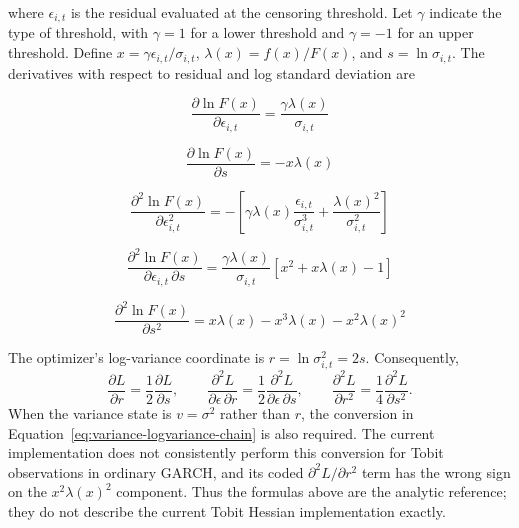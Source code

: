 \documentclass[12pt]{article}
\begin{document}
where $\epsilon_{i,t}$ is the residual evaluated at the censoring threshold. Let
$\gamma$ indicate the type of threshold, with $\gamma = 1$ for a
lower threshold and $\gamma = -1$ for an upper threshold. Define $x=\gamma\epsilon_{i,t}/\sigma_{i,t}$, $\lambda(x)=f(x)/F(x)$, and $s=\ln\sigma_{i,t}$. The derivatives with respect to residual and log standard deviation are

\begin{equation}
\frac{\partial\ln F(x)}{\partial\epsilon_{i,t}} = \frac{\gamma\lambda(x)}{\sigma_{i,t}}
\label{eq:tobit_deriv1}
\end{equation}

\begin{equation}
\frac{\partial\ln F(x)}{\partial s}=-x\lambda(x)
\label{eq:tobit_deriv2}
\end{equation}

\begin{equation}
\frac{\partial^{2}\ln F(x)}{\partial\epsilon_{i,t}^{2}}=-\left[\gamma\lambda(x)\frac{\epsilon_{i,t}}{\sigma_{i,t}^{3}}+\frac{\lambda(x)^{2}}{\sigma_{i,t}^{2}}\right]
\label{eq:tobit_deriv3}
\end{equation}

\begin{equation}
\frac{\partial^{2}\ln F(x)}{\partial\epsilon_{i,t}\,\partial s}
=\frac{\gamma\lambda(x)}{\sigma_{i,t}}\left[x^{2}+x\lambda(x)-1\right]
\label{eq:tobit_deriv4}
\end{equation}

\begin{equation}
\frac{\partial^{2}\ln F(x)}{\partial s^{2}}
=x\lambda(x)-x^{3}\lambda(x)-x^{2}\lambda(x)^{2}
\label{eq:tobit_deriv5}
\end{equation}

The optimizer's log-variance coordinate is $r=\ln\sigma_{i,t}^{2}=2s$. Consequently,
\begin{equation}
\frac{\partial L}{\partial r}=\frac{1}{2}\frac{\partial L}{\partial s},\qquad
\frac{\partial^{2}L}{\partial\epsilon\,\partial r}=\frac{1}{2}\frac{\partial^{2}L}{\partial\epsilon\,\partial s},\qquad
\frac{\partial^{2}L}{\partial r^{2}}=\frac{1}{4}\frac{\partial^{2}L}{\partial s^{2}}.
\label{eq:tobit-logvar-conversion}
\end{equation}
When the variance state is $v=\sigma^{2}$ rather than $r$, the conversion in Equation~\ref{eq:variance-logvariance-chain} is also required. The current implementation does not consistently perform this conversion for Tobit observations in ordinary GARCH, and its coded $\partial^{2}L/\partial r^{2}$ term has the wrong sign on the $x^{2}\lambda(x)^{2}$ component. Thus the formulas above are the analytic reference; they do not describe the current Tobit Hessian implementation exactly.
\end{document}
